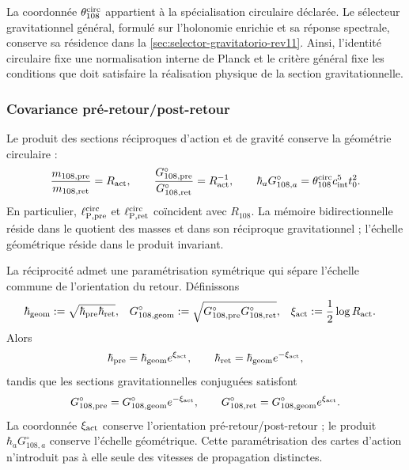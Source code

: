 La coordonnée \(\theta_{108}^{\rm circ}\) appartient à la spécialisation
circulaire déclarée. Le sélecteur gravitationnel général, formulé sur
l’holonomie enrichie et sa réponse spectrale, conserve sa résidence dans
la \cref{sec:selector-gravitatorio-rev11}. Ainsi, l’identité
circulaire fixe une normalisation interne de Planck et le critère général
fixe les conditions que doit satisfaire la réalisation physique de la
section gravitationnelle.

\subsubsection{Covariance pré-retour/post-retour}

Le produit des sections réciproques d’action et de gravité conserve la
géométrie circulaire :
\begin{equation}
 \frac{m_{108,\rm pre}}{m_{108,\rm ret}}=R_{\rm act},
 \qquad
 \frac{G_{108,\rm pre}^{\circ}}{G_{108,\rm ret}^{\circ}}
 =R_{\rm act}^{-1},
 \qquad
 \hbar_a G_{108,a}^{\circ}
 =\theta_{108}^{\rm circ}c_{\rm int}^{5}t_0^2.
 \label{eq:planck-ct108-covariancia-pre-ret-rev3}
\end{equation}
En particulier, \(\ell_{{\rm P},\rm pre}^{\rm circ}\) et
\(\ell_{{\rm P},\rm ret}^{\rm circ}\) coïncident avec \(R_{108}\). La mémoire
bidirectionnelle réside dans le quotient des masses et dans son réciproque
gravitationnel ; l’échelle géométrique réside dans le produit invariant.

La réciprocité admet une paramétrisation symétrique qui sépare l’échelle
commune de l’orientation du retour. Définissons
\begin{equation}
 \begin{aligned}
 \hbar_{\rm geom}
 &:=\sqrt{\hbar_{\rm pre}\hbar_{\rm ret}},
 &
 G_{108,\rm geom}^{\circ}
 &:=\sqrt{G_{108,\rm pre}^{\circ}G_{108,\rm ret}^{\circ}},
 &
 \xi_{\rm act}&:=\frac12\log R_{\rm act}.
 \end{aligned}
 \label{eq:planck-ct108-parametrizacion-simetrica-rev3}
\end{equation}
Alors
\[
 \hbar_{\rm pre}=\hbar_{\rm geom}e^{\xi_{\rm act}},
 \qquad
 \hbar_{\rm ret}=\hbar_{\rm geom}e^{-\xi_{\rm act}},
\]
tandis que les sections gravitationnelles conjuguées satisfont
\[
 G_{108,\rm pre}^{\circ}
 =G_{108,\rm geom}^{\circ}e^{-\xi_{\rm act}},
 \qquad
 G_{108,\rm ret}^{\circ}
 =G_{108,\rm geom}^{\circ}e^{\xi_{\rm act}}.
\]
La coordonnée \(\xi_{\rm act}\) conserve l’orientation
pré-retour/post-retour ; le produit \(\hbar_aG_{108,a}^{\circ}\)
conserve l’échelle géométrique. Cette paramétrisation des cartes d’action
n’introduit pas à elle seule des vitesses de propagation distinctes.

